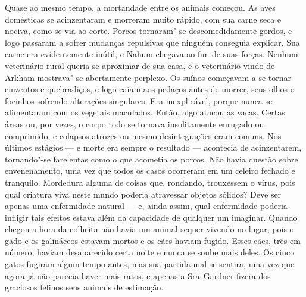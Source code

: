 Quase ao mesmo tempo, a mortandade entre os animais começou. As aves
domésticas se acinzentaram e morreram muito rápido, com sua carne seca e
nociva, como se via ao corte. Porcos tornaram"-se descomedidamente
gordos, e logo passaram a sofrer mudanças repulsivas que ninguém
conseguia explicar. Sua carne era evidentemente inútil, e Nahum chegava
ao fim de suas forças. Nenhum veterinário rural queria se aproximar de
sua casa, e o veterinário vindo de Arkham mostrava"-se abertamente
perplexo. Os suínos começavam a se tornar cinzentos e quebradiços, e
logo caíam aos pedaços antes de morrer, seus olhos e focinhos sofrendo
alterações singulares. Era inexplicável, porque nunca se alimentaram com
os vegetais maculados. Então, algo atacou as vacas. Certas áreas ou, por
vezes, o corpo todo se tornava insolitamente enrugado ou comprimido, e
colapsos atrozes ou mesmo desintegrações eram comuns. Nos últimos
estágios --- e morte era sempre o
resultado --- acontecia de acinzentarem, tornando"-se farelentas como o
que acometia os porcos. Não havia questão sobre envenenamento, uma vez
que todos os casos ocorreram em um celeiro fechado e tranquilo.
Mordedura alguma de coisas que, rondando, trouxessem o vírus, pois qual
criatura viva neste mundo poderia atravessar objetos sólidos? Deve ser
apenas uma enfermidade natural --- e, ainda assim, qual enfermidade
poderia infligir tais efeitos estava além da capacidade de qualquer um
imaginar. Quando chegou a hora da colheita não havia um animal sequer
vivendo no lugar, pois o gado e os galináceos estavam mortos e os cães
haviam fugido. Esses cães, três em número, haviam desaparecido certa
noite e nunca se soube mais deles. Os cinco gatos fugiram algum tempo
antes, mas sua partida mal se sentira, uma vez que agora já não parecia
haver mais ratos, e apenas a Sra.\,Gardner fizera dos graciosos felinos
seus animais de estimação.

